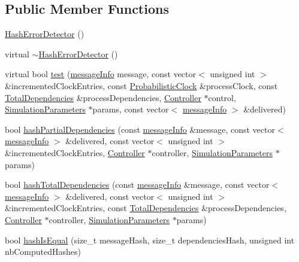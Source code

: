 \subsection*{Public Member Functions}
\begin{DoxyCompactItemize}
\item 
\hyperlink{class_hash_error_detector_a008bd7bd3f8d202334afd51a71cbbdae}{Hash\+Error\+Detector} ()
\item 
virtual \hyperlink{class_hash_error_detector_a187ba4d9f902ecaa0ff8b92ec531d3f4}{$\sim$\+Hash\+Error\+Detector} ()
\item 
virtual bool \hyperlink{class_hash_error_detector_a1c7fe649a34cf7e139ce53a248dce748}{test} (\hyperlink{structures_8h_a7e7bdc1d2fff8a9436f2f352b2711ed6}{message\+Info} message, const vector$<$ unsigned int $>$ \&incremented\+Clock\+Entries, const \hyperlink{class_probabilistic_clock}{Probabilistic\+Clock} \&process\+Clock, const \hyperlink{class_total_dependencies}{Total\+Dependencies} \&process\+Dependencies, \hyperlink{class_controller}{Controller} $\ast$control, \hyperlink{class_simulation_parameters}{Simulation\+Parameters} $\ast$params, const vector$<$ \hyperlink{structures_8h_a7e7bdc1d2fff8a9436f2f352b2711ed6}{message\+Info} $>$ \&delivered)
\item 
bool \hyperlink{class_hash_error_detector_a851c562e49f608ec3fe3e984db27bfca}{hash\+Partial\+Dependencies} (const \hyperlink{structures_8h_a7e7bdc1d2fff8a9436f2f352b2711ed6}{message\+Info} \&message, const vector$<$ \hyperlink{structures_8h_a7e7bdc1d2fff8a9436f2f352b2711ed6}{message\+Info} $>$ \&delivered, const vector$<$ unsigned int $>$ \&incremented\+Clock\+Entries, \hyperlink{class_controller}{Controller} $\ast$controller, \hyperlink{class_simulation_parameters}{Simulation\+Parameters} $\ast$params)
\item 
bool \hyperlink{class_hash_error_detector_a13dd5fae3ca4898bd91d1801beed24a4}{hash\+Total\+Dependencies} (const \hyperlink{structures_8h_a7e7bdc1d2fff8a9436f2f352b2711ed6}{message\+Info} \&message, const vector$<$ \hyperlink{structures_8h_a7e7bdc1d2fff8a9436f2f352b2711ed6}{message\+Info} $>$ \&delivered, const vector$<$ unsigned int $>$ \&incremented\+Clock\+Entries, const \hyperlink{class_total_dependencies}{Total\+Dependencies} \&process\+Dependencies, \hyperlink{class_controller}{Controller} $\ast$controller, \hyperlink{class_simulation_parameters}{Simulation\+Parameters} $\ast$params)
\item 
bool \hyperlink{class_hash_error_detector_a93b22ebde71c18f801319b33ce30899c}{hash\+Is\+Equal} (size\+\_\+t message\+Hash, size\+\_\+t dependencies\+Hash, unsigned int nb\+Computed\+Hashes)

\end{DoxyCompactItemize}

